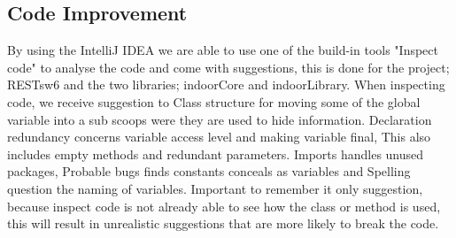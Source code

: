 \subsection*{Code Improvement}
By using the IntelliJ IDEA we are able to use one of the build-in tools "Inspect code" to analyse the code and come with suggestions, this is done for the project; RESTsw6 and the two libraries; indoorCore and indoorLibrary. When inspecting code, we receive suggestion to Class structure for moving some of the global variable into a sub scoops were they are used to hide information. Declaration redundancy concerns variable access level and making variable final, This also includes empty methods and redundant parameters. Imports handles unused packages, Probable bugs finds constants conceals as variables and Spelling question the naming of variables. Important to remember it only suggestion, because inspect code is not already able to see how the class or method is used, this will result in unrealistic suggestions that are more likely to break the code.

